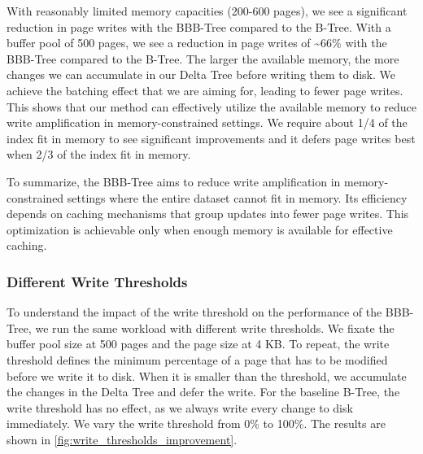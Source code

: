 With reasonably limited memory capacities (200-600 pages), we see a significant reduction in page writes with the BBB-Tree compared to the B-Tree.
With a buffer pool of 500 pages, we see a reduction in page writes of \textasciitilde66\% with the BBB-Tree compared to the B-Tree.
The larger the available memory, the more changes we can accumulate in our Delta Tree before writing them to disk.
We achieve the batching effect that we are aiming for, leading to fewer page writes.
This shows that our method can effectively utilize the available memory to reduce write amplification in memory-constrained settings.
We require about 1/4 of the index fit in memory to see significant improvements and it defers page writes best when 2/3 of the index fit in memory.

To summarize, the BBB-Tree aims to reduce write amplification in memory-constrained settings where the entire dataset cannot fit in memory.
Its efficiency depends on caching mechanisms that group updates into fewer page writes. 
This optimization is achievable only when enough memory is available for effective caching.

\subsubsection*{Different Write Thresholds}
To understand the impact of the write threshold on the performance of the BBB-Tree, we run the same workload with different write thresholds.
We fixate the buffer pool size at 500 pages and the page size at 4 KB.
To repeat, the write threshold defines the minimum percentage of a page that has to be modified before we write it to disk.
When it is smaller than the threshold, we accumulate the changes in the Delta Tree and defer the write.
For the baseline B-Tree, the write threshold has no effect, as we always write every change to disk immediately.
We vary the write threshold from 0\% to 100\%.
The results are shown in \autoref{fig:write_thresholds_improvement}.

